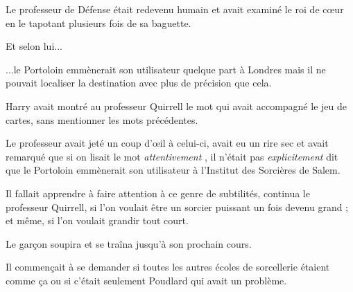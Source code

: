 Le professeur de Défense était redevenu humain et avait examiné le roi de cœur en le tapotant plusieurs fois de sa baguette.

Et selon lui...

...le Portoloin emmènerait son utilisateur quelque part à Londres mais il ne pouvait localiser la destination avec plus de précision que cela.

Harry avait montré au professeur Quirrell le mot qui avait accompagné le jeu de cartes, sans mentionner les mots précédentes.

Le professeur avait jeté un coup d'œil à celui-ci, avait eu un rire sec et avait remarqué que si on lisait le mot \emph{attentivement} , il n'était pas \emph{explicitement}  dit que le Portoloin emmènerait son utilisateur à l'Institut des Sorcières de Salem.

Il fallait apprendre à faire attention à ce genre de subtilités, continua le professeur Quirrell, si l'on voulait être un sorcier puissant un fois devenu grand ; et même, si l'on voulait grandir tout court.

Le garçon soupira et se traîna jusqu'à son prochain cours.

Il commençait à se demander si toutes les autres écoles de sorcellerie étaient comme ça ou si c'était seulement Poudlard qui avait un problème.

